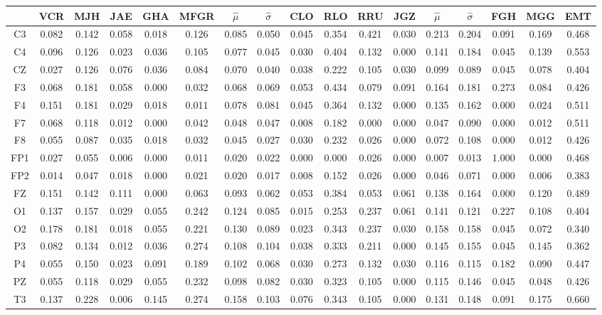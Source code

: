 \begin{SidewaysFigure}
\centering
\begin{tabular}{c||ccccc|cc||cccc|cc||ccc}
& VCR & MJH & JAE & GHA & MFGR &$\widehat{\mu}$ & $\widehat{\sigma}$
& CLO & RLO & RRU & JGZ &$\widehat{\mu}$ & $\widehat{\sigma}$
& FGH & MGG & EMT \\
\hline
C3&0.082&0.142&0.058&0.018&0.126&0.085&0.050&0.045&0.354&0.421&0.030&0.213&0.204&0.091&0.169&0.468 \\
C4&0.096&0.126&0.023&0.036&0.105&0.077&0.045&0.030&0.404&0.132&0.000&0.141&0.184&0.045&0.139&0.553 \\
CZ&0.027&0.126&0.076&0.036&0.084&0.070&0.040&0.038&0.222&0.105&0.030&0.099&0.089&0.045&0.078&0.404 \\
F3&0.068&0.181&0.058&0.000&0.032&0.068&0.069&0.053&0.434&0.079&0.091&0.164&0.181&0.273&0.084&0.426 \\
F4&0.151&0.181&0.029&0.018&0.011&0.078&0.081&0.045&0.364&0.132&0.000&0.135&0.162&0.000&0.024&0.511 \\
F7&0.068&0.118&0.012&0.000&0.042&0.048&0.047&0.008&0.182&0.000&0.000&0.047&0.090&0.000&0.012&0.511 \\
F8&0.055&0.087&0.035&0.018&0.032&0.045&0.027&0.030&0.232&0.026&0.000&0.072&0.108&0.000&0.012&0.426 \\
FP1&0.027&0.055&0.006&0.000&0.011&0.020&0.022&0.000&0.000&0.026&0.000&0.007&0.013&1.000&0.000&0.468 \\
FP2&0.014&0.047&0.018&0.000&0.021&0.020&0.017&0.008&0.152&0.026&0.000&0.046&0.071&0.000&0.006&0.383 \\
FZ&0.151&0.142&0.111&0.000&0.063&0.093&0.062&0.053&0.384&0.053&0.061&0.138&0.164&0.000&0.120&0.489 \\
O1&0.137&0.157&0.029&0.055&0.242&0.124&0.085&0.015&0.253&0.237&0.061&0.141&0.121&0.227&0.108&0.404 \\
O2&0.178&0.181&0.018&0.055&0.221&0.130&0.089&0.023&0.343&0.237&0.030&0.158&0.158&0.045&0.072&0.340 \\
P3&0.082&0.134&0.012&0.036&0.274&0.108&0.104&0.038&0.333&0.211&0.000&0.145&0.155&0.045&0.145&0.362 \\
P4&0.055&0.150&0.023&0.091&0.189&0.102&0.068&0.030&0.273&0.132&0.030&0.116&0.115&0.182&0.090&0.447 \\
PZ&0.055&0.118&0.029&0.055&0.232&0.098&0.082&0.030&0.323&0.105&0.000&0.115&0.146&0.045&0.048&0.426 \\
T3&0.137&0.228&0.006&0.145&0.274&0.158&0.103&0.076&0.343&0.105&0.000&0.131&0.148&0.091&0.175&0.660 \\

\end{tabular}
\end{SidewaysFigure}
